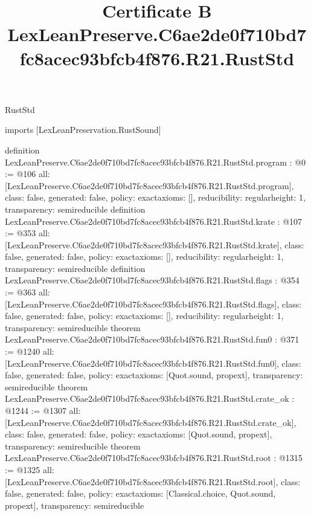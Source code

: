 \begin{lexlean}{RustStd}
\title{Certificate B LexLeanPreserve.C6ae2de0f710bd7fc8acec93bfcb4f876.R21.RustStd}
\begin{coremodule}
imports [LexLeanPreservation.RustSound]

definition LexLeanPreserve.C6ae2de0f710bd7fc8acec93bfcb4f876.R21.RustStd.program : @0 := @106 {
  all: [LexLeanPreserve.C6ae2de0f710bd7fc8acec93bfcb4f876.R21.RustStd.program],
  class: false,
  generated: false,
  policy: exact{axioms: []},
  reducibility: regular{height: 1},
  transparency: semireducible
}
definition LexLeanPreserve.C6ae2de0f710bd7fc8acec93bfcb4f876.R21.RustStd.krate : @107 := @353 {
  all: [LexLeanPreserve.C6ae2de0f710bd7fc8acec93bfcb4f876.R21.RustStd.krate],
  class: false,
  generated: false,
  policy: exact{axioms: []},
  reducibility: regular{height: 1},
  transparency: semireducible
}
definition LexLeanPreserve.C6ae2de0f710bd7fc8acec93bfcb4f876.R21.RustStd.flags : @354 := @363 {
  all: [LexLeanPreserve.C6ae2de0f710bd7fc8acec93bfcb4f876.R21.RustStd.flags],
  class: false,
  generated: false,
  policy: exact{axioms: []},
  reducibility: regular{height: 1},
  transparency: semireducible
}
theorem LexLeanPreserve.C6ae2de0f710bd7fc8acec93bfcb4f876.R21.RustStd.fun0 : @371 := @1240 {
  all: [LexLeanPreserve.C6ae2de0f710bd7fc8acec93bfcb4f876.R21.RustStd.fun0],
  class: false,
  generated: false,
  policy: exact{axioms: [Quot.sound, propext]},
  transparency: semireducible
}
theorem LexLeanPreserve.C6ae2de0f710bd7fc8acec93bfcb4f876.R21.RustStd.crate_ok : @1244 := @1307 {
  all: [LexLeanPreserve.C6ae2de0f710bd7fc8acec93bfcb4f876.R21.RustStd.crate_ok],
  class: false,
  generated: false,
  policy: exact{axioms: [Quot.sound, propext]},
  transparency: semireducible
}
theorem LexLeanPreserve.C6ae2de0f710bd7fc8acec93bfcb4f876.R21.RustStd.root : @1315 := @1325 {
  all: [LexLeanPreserve.C6ae2de0f710bd7fc8acec93bfcb4f876.R21.RustStd.root],
  class: false,
  generated: false,
  policy: exact{axioms: [Classical.choice, Quot.sound, propext]},
  transparency: semireducible
}


\end{coremodule}
\end{lexlean}
